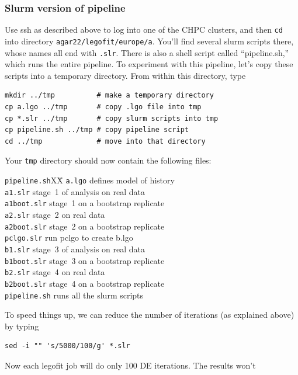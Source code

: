 \documentclass[11pt]{article}
\newenvironment{leftindent}%
{\begin{list}{}%
         {\setlength{\leftmargin}{2em}}%
         \item[]%
}{\end{list}}
\begin{document}
\subsubsection{Slurm version of pipeline}
\label{sec.slurmpipe}
Use ssh as described above to log into one of the CHPC clusters, and
then \texttt{cd} into directory
\texttt{agar22/legofit/europe/a}. You'll find several slurm scripts
there, whose names all end with \texttt{.slr}. There is also a shell
script called ``pipeline.sh,'' which runs the entire pipeline.  To
experiment with this pipeline, let's copy these scripts into a
temporary directory. From within this directory, type
\begin{verbatim}
mkdir ../tmp          # make a temporary directory
cp a.lgo ../tmp       # copy .lgo file into tmp
cp *.slr ../tmp       # copy slurm scripts into tmp
cp pipeline.sh ../tmp # copy pipeline script
cd ../tmp             # move into that directory
\end{verbatim}
Your \texttt{tmp} directory should now contain the following files:
\begin{leftindent}
  \begin{tabbing}
\verb|pipeline.sh|XX\=\kill
\texttt{a.lgo} \> defines model of history\\    
\texttt{a1.slr} \> stage~1 of analysis on real data\\
\texttt{a1boot.slr} \> stage~1 on a bootstrap replicate\\
\texttt{a2.slr} \> stage~2 on real data\\
\texttt{a2boot.slr} \> stage~2 on a bootstrap replicate\\
\texttt{pclgo.slr} \> run pclgo to create b.lgo  \\
\texttt{b1.slr} \> stage~3 of analysis on real data\\
\texttt{b1boot.slr} \> stage~3 on a bootstrap replicate\\
\texttt{b2.slr} \> stage~4 on real data\\
\texttt{b2boot.slr} \> stage~4 on a bootstrap replicate\\
\verb|pipeline.sh| \> runs all the slurm scripts
\end{tabbing}
\end{leftindent}
To speed things up, we can reduce the number of iterations (as
explained above) by typing
\begin{verbatim}
sed -i "" 's/5000/100/g' *.slr 
\end{verbatim}
Now each legofit job will do only 100 DE iterations. The results won't
\end{document}
